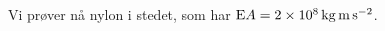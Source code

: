 Vi prøver nå nylon i stedet, som har $\mathrm{E} A = \SI{2e8}{\kilo\gram\meter\per\second\squared}$.
\begin{figure}[H]
  \scalebox{.6}{}
\end{figure}
